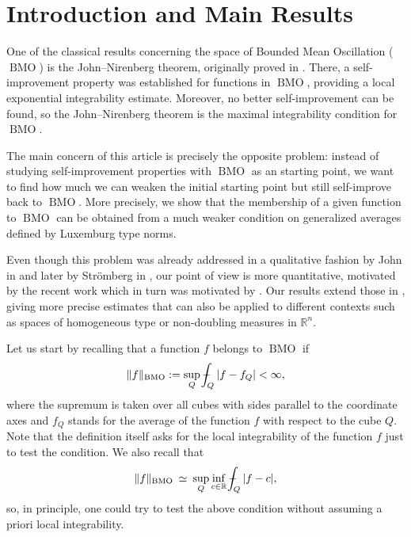 \documentclass[11pt,a4paper]{amsart}
\theoremstyle{definition}
\theoremstyle{remark}
\numberwithin{equation}{section}
\DeclareMathOperator{\BMO}{BMO}
\def\R{{\mathbb R}}
\def\Xint#1{\mathchoice
  {\XXint\displaystyle\textstyle{#1}}%
  {\XXint\textstyle\scriptstyle{#1}}%
  {\XXint\scriptstyle\scriptscriptstyle{#1}}%
  {\XXint\scriptscriptstyle\scriptscriptstyle{#1}}%
  \!\int}
\def\XXint#1#2#3{{\setbox0=\hbox{$#1{#2#3}{\int}$}
    \vcenter{\hbox{$#2#3$}}\kern-.5\wd0}}
\def\avgint{\Xint-}
\numberwithin{equation}{section}
\begin{document}
\maketitle









\section{Introduction and Main Results}\label{sec:intro}


One of the classical results concerning the space of Bounded Mean Oscillation ($\BMO$) is the John--Nirenberg theorem, originally proved in \cite{JN}. There, a self-improvement property was established for functions in $\BMO$, providing a local exponential integrability estimate. Moreover, no better self-improvement can be found, so the John--Nirenberg theorem is the maximal integrability condition for $\BMO$. 

The main concern of this article is precisely the opposite problem: instead of studying self-improvement properties with $\BMO$ as an starting point, we want to find how much we can weaken the initial starting point but still self-improve back to $\BMO$. More precisely, we show that the membership of a given function to $\BMO$ can be obtained from a much weaker condition on generalized averages defined by  Luxemburg type norms.

Even though this problem was already addressed in a qualitative fashion by John in \cite{John1965} and later by Str\"omberg in \cite{Stromberg79}, our point of view is more quantitative, motivated by the recent work \cite{LSSVZ-BMO} which in turn was motivated by \cite{LongYang}. Our results extend those in \cite{LSSVZ-BMO}, giving more precise estimates that can also be applied to different contexts such as spaces of homogeneous type or non-doubling measures in $\R^n$.


Let us start by recalling that a function $f$ belongs to $\BMO$ if 
\begin{equation*}%
\|f\|_{\BMO}:=\sup_{Q}\avgint_Q |f-f_Q|<\infty,
\end{equation*}
where the supremum is taken over all cubes with sides parallel to the coordinate axes and $f_Q$ stands for the average of the function $f$ with respect to the cube $Q$. Note that the definition itself asks for the local integrability of the function $f$ just to test the condition. We also recall that 
\begin{equation}\label{eq:BMOclassic-vs-BMOinf}
\|f\|_{\BMO}\: \simeq \: \sup_{Q}\inf_{c\in \R}\avgint_Q |f-c|,
\end{equation}
so, in principle, one could try to test the above condition without assuming a priori local integrability.
\end{document}
